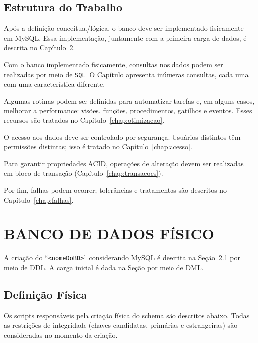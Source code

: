 \documentclass[
12pt,
a4paper,
semrecuonosumario,
sumario = abnt-6027-2012]{report}
\begin{document}
    \section{Estrutura do Trabalho}\label{sec:EstruturaTrabalho}
    Após a definição conceitual/lógica, o banco deve ser implementado fisicamente em MySQL.
    Essa implementação, juntamente com a primeira carga de dados, é descrita no Capítulo~\ref{chap:fisico}.
    
    Com o banco implementado fisicamente, consultas nos dados podem ser realizadas por meio de \texttt{SQL}.
    O Capítulo apresenta inúmeras consultas, cada uma com uma característica diferente.
    
    Algumas rotinas podem ser definidas para automatizar tarefas e, em alguns casos, melhorar a performance:
    visões, funções, procedimentos, gatilhos e eventos. Esses recursos são tratados no Capítulo~\ref{chap:otimizacao}.
    
    O acesso aos dados deve ser controlado por segurança. Usuários distintos têm permissões distintas; isso é tratado no Capítulo~\ref{chap:acesso}.
    
    Para garantir propriedades ACID, operações de alteração devem ser realizadas em bloco de transação (Capítulo~\ref{chap:transacoes}).
    
    Por fim, falhas podem ocorrer; tolerâncias e tratamentos são descritos no Capítulo~\ref{chap:falhas}.
    
    \chapter{BANCO DE DADOS FÍSICO}\label{chap:fisico}
    A criação do ``\texttt{<nomeDoBD>}'' considerando MySQL é descrita na Seção~\ref{sec:def-fisica} por meio de DDL.
    A carga inicial é dada na Seção por meio de DML.
    
    \section{Definição Física}\label{sec:def-fisica}
    Os scripts responsáveis pela criação física do schema são descritos abaixo. Todas as restrições de integridade
    (chaves candidatas, primárias e estrangeiras) são consideradas no momento da criação.
    
\end{document}
